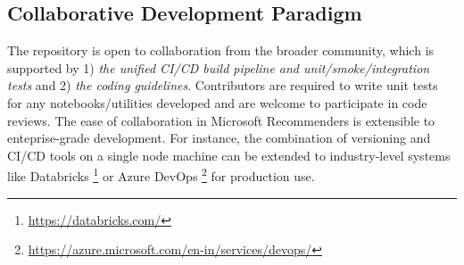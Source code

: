 \subsection{Collaborative Development Paradigm} %

The repository is open to collaboration from the broader community, which is supported by 
1) \textit{the unified CI/CD build pipeline and unit/smoke/integration tests} and  
2) \textit{the coding guidelines}. Contributors are required to write unit tests for any notebooks/utilities developed and 
are welcome to participate in code reviews.
The ease of collaboration in Microsoft Recommenders is extensible to enteprise-grade development. 
For instance, the combination of versioning and CI/CD tools on a single node machine can be extended to industry-level systems like Databricks \footnote{\url{https://databricks.com/}} or Azure DevOps \footnote{\url{https://azure.microsoft.com/en-in/services/devops/}} for production use.